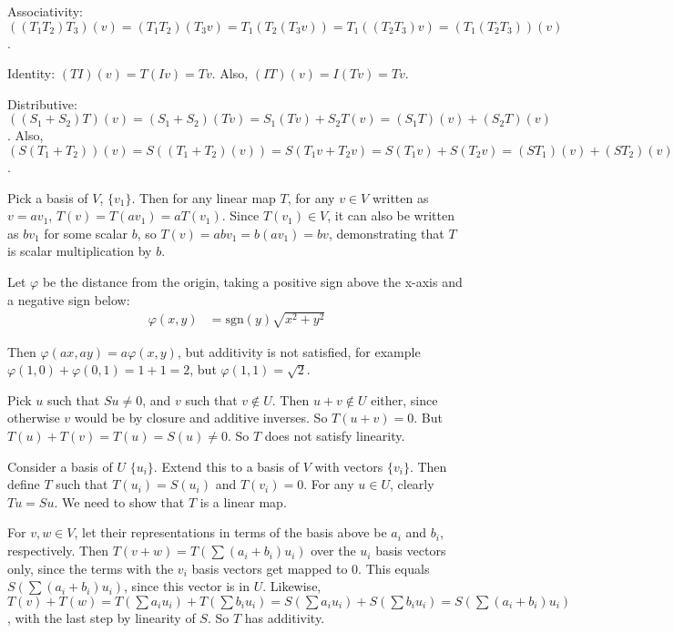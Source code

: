 \documentclass{article}
\begin{document}
Associativity: $((T_1T_2)T_3)(v) = (T_1T_2)(T_3v) = T_1(T_2(T_3v)) =
T_1((T_2T_3)v) = (T_1(T_2T_3))(v)$.

Identity: $(TI)(v) = T(Iv) = Tv$. Also, $(IT)(v) = I(Tv) = Tv$.

Distributive: $((S_1 + S_2)T)(v) = (S_1 + S_2)(Tv) = S_1(Tv) + S_2T(v) =
(S_1T)(v) + (S_2T)(v)$. Also, $(S(T_1 + T_2))(v) = S((T_1 + T_2)(v)) = S(T_1v +
T_2v) = S(T_1v) + S(T_2v) = (ST_1)(v) + (ST_2)(v)$.


Pick a basis of $V$, $\{v_1\}$. Then for any linear map $T$, for any $v \in V$
written as $v = av_1$, $T(v) = T(av_1) = aT(v_1)$. Since $T(v_1) \in V$, it can
also be written as $bv_1$ for some scalar $b$, so $T(v) = abv_1 = b(av_1) = bv$,
demonstrating that $T$ is scalar multiplication by $b$.


Let $\varphi$ be the distance from the origin, taking a positive sign above the
x-axis and a negative sign below:
\begin{align*}
\varphi(x,y) & = \text{sgn}(y)\sqrt{x^2 + y^2}
\end{align*}

Then $\varphi(ax,ay) = a \varphi(x,y)$, but additivity is not satisfied, for
example $\varphi(1,0) + \varphi(0,1) = 1 + 1 = 2$, but $\varphi(1,1) =
\sqrt{2}$.



Pick $u$ such that $Su \neq 0$, and $v$ such that $v \notin U$. Then $u+v \notin
U$ either, since otherwise $v$ would be by closure and additive inverses. So
$T(u+v) = 0$. But $T(u) + T(v) = T(u) = S(u) \neq 0$. So $T$ does not satisfy
linearity.


Consider a basis of $U$ $\{u_i\}$. Extend this to a basis of $V$ with vectors
$\{v_i\}$. Then define $T$ such that $T(u_i) = S(u_i)$ and $T(v_i) = 0$. For any
$u \in U$, clearly $Tu = Su$. We need to show that $T$ is a linear map.

For $v, w \in V$, let their representations in terms of the basis above be $a_i$
and $b_i$, respectively. Then $T(v+w) = T(\sum (a_i + b_i) u_i)$ over the $u_i$
basis vectors only, since the terms with the $v_i$ basis vectors get mapped to
0. This equals $S(\sum (a_i + b_i) u_i)$, since this vector is in $U$. Likewise,
$T(v) + T(w) = T(\sum a_iu_i) + T(\sum b_iu_i) = S(\sum a_iu_i) + S(\sum b_iu_i)
= S(\sum (a_i + b_i) u_i)$, with the last step by linearity of $S$. So $T$ has
additivity.
\end{document}
